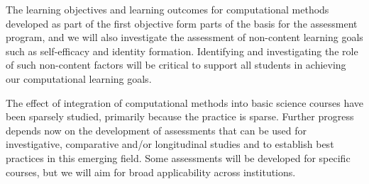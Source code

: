 The learning objectives and learning outcomes for computational
methods developed as part of the first objective form parts of the
basis for the assessment program, and we will also investigate the
assessment of non-content learning goals such as self-efficacy and
identity formation. Identifying and investigating the role of such non-content
factors will be critical to support all students in achieving our computational
learning goals.

The effect of integration of computational methods into basic science
courses have been sparsely studied, primarily because the practice is
sparse. Further progress depends now on the development of assessments
that can be used for investigative, comparative and/or longitudinal
studies and to establish best practices in this emerging field.  Some
assessments will be developed for specific courses, but we will aim
for broad applicability across institutions.

